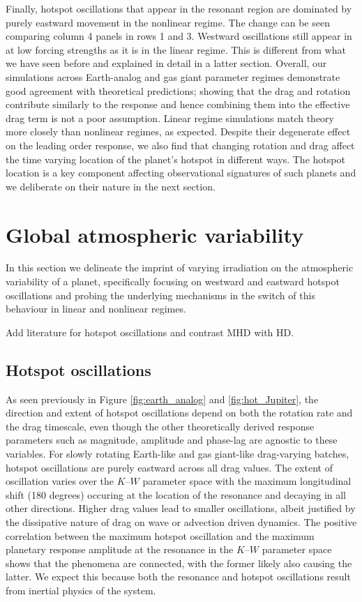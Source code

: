 \documentclass[trackchanges,twocolumn]{aastex7}
\begin{document}
Finally, hotspot oscillations that appear in the resonant region are dominated by purely eastward movement in the nonlinear regime. The change can be seen comparing column 4 panels in rows 1 and 3. Westward oscillations still appear in at low forcing strengths as it is in the linear regime. This is different from what we have seen before and explained in detail in a latter section. Overall, our simulations across Earth-analog and gas giant parameter regimes demonstrate good agreement with theoretical predictions; showing that the drag and rotation contribute similarly to the response and hence combining them into the effective drag term is not a poor assumption. Linear regime simulations match theory more closely than nonlinear regimes, as expected. Despite their degenerate effect on the leading order response, we also find that changing rotation and drag affect the time varying location of the planet's hotspot in different ways. The hotspot location is a key component affecting observational signatures of such planets and we deliberate on their nature in the next section.


\section{Global atmospheric variability}
\label{sec:discussion}

In this section we delineate the imprint of varying irradiation on the atmospheric variability of a planet, specifically focusing on westward and eastward hotspot oscillations and probing the underlying mechanisms in the switch of this behaviour in linear and nonlinear regimes. 

{\color{red}Add literature for hotspot oscillations and contrast MHD with HD.}

\subsection{Hotspot oscillations}

As seen previously in Figure \ref{fig:earth_analog} and \ref{fig:hot_Jupiter}, the direction and extent of hotspot oscillations depend on both the rotation rate and the drag timescale, even though the other theoretically derived response parameters such as magnitude, amplitude and phase-lag are agnostic to these variables. For slowly rotating Earth-like and gas giant-like drag-varying batches, hotspot oscillations are purely eastward across all drag values. The extent of oscillation varies over the $K$--$W$ parameter space with the maximum longitudinal shift (180 degrees) occuring at the location of the resonance and decaying in all other directions. Higher drag values lead to smaller oscillations, albeit justified by the dissipative nature of drag on wave or advection driven dynamics. The positive correlation between the maximum hotspot oscillation and the maximum planetary response amplitude at the resonance in the $K$--$W$ parameter space shows that the phenomena are connected, with the former likely also causing the latter. We expect this because both the resonance and hotspot oscillations result from inertial physics of the system. 
\end{document}
